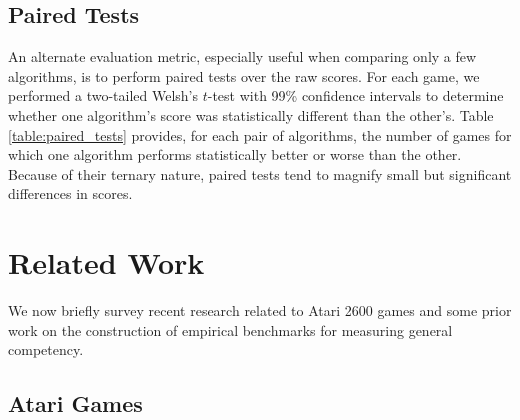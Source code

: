 \documentclass[twoside,11pt]{article}
\begin{document}
\subsection{Paired Tests}

An alternate evaluation metric, especially useful when comparing only a few algorithms, is to perform paired tests over the raw scores. For each game, we performed a two-tailed Welsh's $t$-test with 99\% confidence intervals to determine whether one algorithm's score was statistically different than the other's. Table \ref{table:paired_tests} provides, for each pair of algorithms, the number of games for which one algorithm performs statistically better or worse than the other. Because of their ternary nature, paired tests tend to magnify small but significant differences in scores. 

\section{Related Work}
\label{sec:relatedwork}

We now briefly survey recent research related to Atari 2600 games and some prior work on the construction of empirical benchmarks for measuring general competency.

\subsection{Atari Games}\label{sec:prior_work_on_atari}
\end{document}
